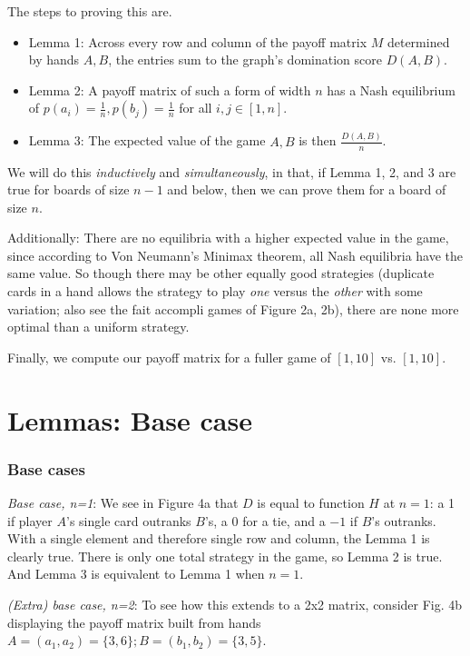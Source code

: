 \documentclass[11pt, oneside]{article} 	%
\begin{document}
The steps to proving this are.

\begin{itemize}
\item Lemma 1: Across every row and column of the payoff matrix $M$ determined by hands $A, B$, the entries sum to the graph's domination score $D(A,B)$.
\item Lemma 2: A payoff matrix of such a form of width $n$ has a Nash equilibrium\cite{2} of $p(a_i) = \frac{1}{n}, p(b_j) = \frac{1}{n}$ for all $i, j \in [1,n]$.
\item Lemma 3: The expected value of the game $A, B$ is then $\frac{D(A,B)}{n}$.
\end{itemize}

We will do this \emph{inductively} and \emph{simultaneously}, in that, if Lemma 1, 2, and 3 are true for boards of size $n-1$ and below, then we can prove them for a board of size $n$.

Additionally: There are no equilibria with a higher expected value in the game, since according to Von Neumann's Minimax theorem\cite{3}, all Nash equilibria have the same value. So though there may be other equally good strategies (duplicate cards in a hand allows the strategy to play \emph{one} versus the \emph{other} with some variation; also see the fait accompli games of Figure 2a, 2b), there are none more optimal than a uniform strategy.


Finally, we compute our payoff matrix for a fuller game of $[1,10]$ vs. $[1,10]$.

\section{Lemmas: Base case}



\subsubsection{Base cases} 
\emph{Base case, n=1}: We see in Figure 4a that $D$ is equal to function $H$ at $n=1$: a 1 if player $A$'s single card outranks $B$'s, a 0 for a tie, and a $-1$ if $B$'s outranks. With a single element and therefore single row and column, the Lemma 1 is clearly true. There is only one total strategy in the game, so Lemma 2 is true. And Lemma 3 is equivalent to Lemma 1 when $n=1$.

\emph{(Extra) base case, n=2}: To see how this extends to a 2x2 matrix, consider Fig. 4b displaying the payoff matrix built from hands $A = (a_1, a_2) = \{3, 6\}; B = (b_1,b_2) = \{3,5\}$.
\end{document}
